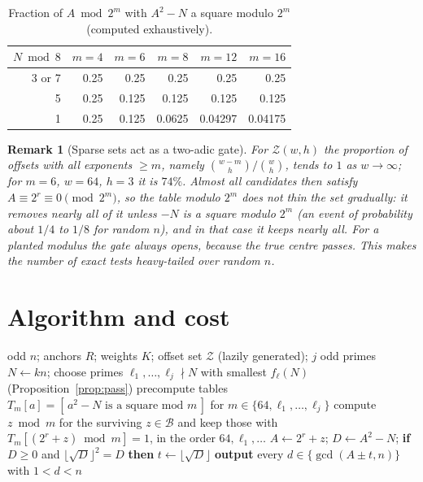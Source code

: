 \documentclass[11pt,a4paper]{article}
\newtheorem{remark}{Remark}[section]
\begin{document}
\begin{table}[ht]\centering\small
\caption{Fraction of $A \bmod 2^m$ with $A^2-N$ a square modulo $2^m$ (computed exhaustively).}\label{tab:twoadic}
\begin{tabular}{@{}rrrrrr@{}}\toprule
$N \bmod 8$ & $m=4$ & $m=6$ & $m=8$ & $m=12$ & $m=16$\\\midrule
3 or 7 & 0.25 & 0.25 & 0.25 & 0.25 & 0.25\\
5 & 0.25 & 0.125 & 0.125 & 0.125 & 0.125\\
1 & 0.25 & 0.125 & 0.0625 & 0.04297 & 0.04175\\\bottomrule
\end{tabular}
\end{table}

\begin{remark}[Sparse sets act as a two-adic gate]
For $\mathcal Z(w,h)$ the proportion of offsets with all exponents $\ge m$, namely $\binom{w-m}{h}/\binom wh$, tends to $1$ as $w\to\infty$; for $m=6$, $w=64$, $h=3$ it is $74\%$. Almost all candidates then satisfy $A\equiv 2^r\equiv0 \pmod{2^m}$, so the table modulo $2^m$ does not thin the set gradually: it removes nearly all of it unless $-N$ is a square modulo $2^m$ (an event of probability about $1/4$ to $1/8$ for random $n$), and in that case it keeps nearly all. For a planted modulus the gate always opens, because the true centre passes. This makes the number of exact tests heavy-tailed over random $n$.
\end{remark}

\section{Algorithm and cost}\label{sec:alg}
\begin{algorithm}[ht]
\caption{$(k,z)$-scan with adaptive sieve}\label{alg:scan}
\begin{algorithmic}[1]
\Require odd $n$; anchors $R$; weights $K$; offset set $\mathcal Z$ (lazily generated); $j$ odd primes
  \State $N\gets kn$; choose primes $\ell_1,\dots,\ell_j\nmid N$ with smallest $f_\ell(N)$ (Proposition~\ref{prop:pass})
  \State precompute tables $T_m[a]=[\,a^2-N \text{ is a square mod } m\,]$ for $m\in\{64,\ell_1,\dots,\ell_j\}$
    \State compute $z\bmod m$ for the surviving $z\in\mathcal B$ and keep those with $T_m[(2^r+z)\bmod m]=1$, in the order $64,\ell_1,\dots$
      \State $A\gets 2^r+z$; $D\gets A^2-N$; \textbf{if} $D\ge0$ and $\lfloor\sqrt D\rfloor^2=D$ \textbf{then} $t\gets\lfloor\sqrt D\rfloor$
      \State \textbf{output} every $d\in\{\gcd(A\pm t,n)\}$ with $1<d<n$
    \EndFor
  \EndFor
\EndFor
\end{algorithmic}
\end{algorithm}
\end{document}
